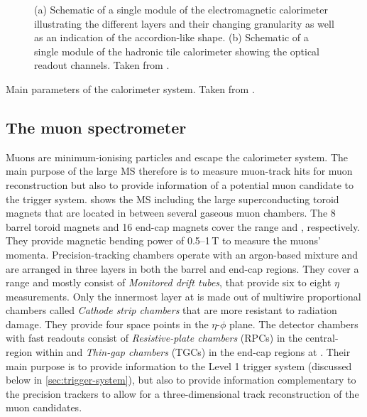 \begin{figure}
    \caption{(a) Schematic of a single module of the electromagnetic calorimeter illustrating the different layers and their changing granularity as well as an indication of the accordion-like shape. (b) Schematic of a single module of the hadronic tile calorimeter showing the optical readout channels. Taken from .}
    \label{fig:ATLASmodules}
\end{figure}

\begin{table}
    \caption{Main parameters of the calorimeter system. Taken from .}
    \label{tab:ATLAScalorimeter-parameters}
\end{table}



\subsection{The muon spectrometer}
Muons are minimum-ionising particles and escape the calorimeter system.
The main purpose of the large MS therefore is to measure muon-track hits for muon reconstruction but also to provide information of a potential muon candidate to the trigger system.
 shows the MS including the large superconducting toroid magnets that are located in between several gaseous muon chambers.
The 8 barrel toroid magnets and 16 end-cap magnets cover the range  and , respectively. They provide magnetic bending power of \numrange{0.5}{1}\,T to measure the muons' momenta. Precision-tracking chambers operate with an argon-based mixture and are arranged in three layers in both the barrel and end-cap regions. They cover a range  and mostly consist of \emph{Monitored drift tubes}, that provide six to eight $\eta$ measurements. Only the innermost layer at  is made out of multiwire proportional chambers called \emph{Cathode strip chambers} that are more resistant to radiation damage. They provide four space points in the $\eta$-$\phi$ plane. The detector chambers with fast readouts consist of \emph{Resistive-plate chambers} (RPCs) in the central-region within  and \emph{Thin-gap chambers} (TGCs) in the end-cap regions at .
Their main purpose is to provide information to the Level 1 trigger system (discussed below in \cref{sec:trigger-system}), but also to provide information complementary to the precision trackers to allow for a three-dimensional track reconstruction of the muon candidates.

